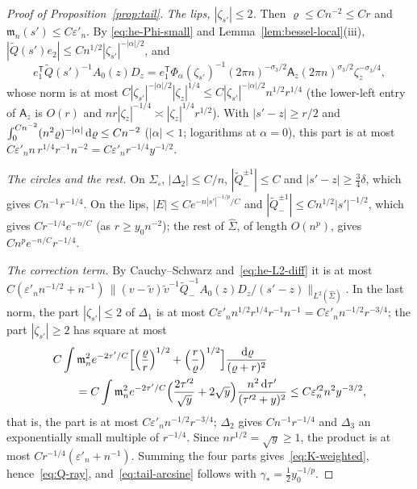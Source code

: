 \begin{proof}[Proof of Proposition~\ref{prop:tail}]
\emph{The lips, $|\zeta_{s'}|\le2$.} Then $\varrho\le Cn^{-2}\le Cr$ and $\mathfrak m_n(s')\le C\varepsilon'_n$. By
\eqref{eq:he-Phi-small} and Lemma~\ref{lem:bessel-local}(iii), $|\tilde Q(s')e_2|\le Cn^{1/2}|\zeta_{s'}|^{-|\alpha|/2}$, and
\[
  e_1^{\mathsf T}\tilde Q(s')^{-1}A_0(z)D_z=e_1^{\mathsf T}\Phi_\alpha(\zeta_{s'})^{-1}(2\pi n)^{-\sigma_3/2}\mathsf A_z(2\pi n)^{\sigma_3/2}
  \zeta_z^{-\sigma_3/4},
\]
whose norm is at most $C|\zeta_{s'}|^{-|\alpha|/2}|\zeta_z|^{1/4}\le C|\zeta_{s'}|^{-|\alpha|/2}n^{1/2}r^{1/4}$
(the lower-left entry of $\mathsf A_z$ is $O(r)$ and $nr|\zeta_z|^{-1/4}\asymp|\zeta_z|^{1/4}r^{1/2}$). With $|s'-z|\ge r/2$ and
$\int_0^{Cn^{-2}}(n^2\varrho)^{-|\alpha|}\,\mathrm{d}\varrho\le Cn^{-2}$ ($|\alpha|<1$; logarithms at $\alpha=0$), this part is at most
$C\varepsilon'_nn\,r^{1/4}r^{-1}n^{-2}=C\varepsilon'_nr^{-1/4}y^{-1/2}$.

\emph{The circles and the rest.} On $\Sigma_\circ$, $|\Delta_2|\le C/n$, $|\tilde Q_-^{\pm1}|\le C$ and $|s'-z|\ge\frac34\delta$,
which gives $Cn^{-1}r^{-1/4}$. On the lips, $|E|\le Ce^{-n|s'|^{-1/p}/C}$ and $|\tilde Q_-^{\pm1}|\le Cn^{1/2}|s'|^{-1/2}$, which
gives $Cr^{-1/4}e^{-n/C}$ (as $r\ge y_0n^{-2}$); the rest of $\hat\Sigma$, of length $O(n^p)$, gives $Cn^pe^{-n/C}r^{-1/4}$.

\emph{The correction term.} By Cauchy--Schwarz and~\eqref{eq:he-L2-diff} it is at most
$C(\varepsilon'_nn^{-1/2}+n^{-1})\,\|(v-\tilde v)\tilde v^{-1}\tilde Q_-^{-1}A_0(z)D_z/(s'-z)\|_{L^2(\hat\Sigma)}$. In the last norm, the
part $|\zeta_{s'}|\le2$ of $\Delta_1$ is at most $C\varepsilon'_nn^{1/2}r^{1/4}r^{-1}n^{-1}=C\varepsilon'_nn^{-1/2}r^{-3/4}$; the part
$|\zeta_{s'}|\ge2$ has square at most
\begin{align*}
  &C\int\mathfrak m_n^2e^{-2\tau'/C}\Bigl[\Bigl(\frac\varrho r\Bigr)^{1/2}+\Bigl(\frac r\varrho\Bigr)^{1/2}\Bigr]\frac{\,\mathrm{d}\varrho}{(\varrho+r)^2}\\
  &\qquad=C\int\mathfrak m_n^2e^{-2\tau'/C}\Bigl(\frac{2\tau'^2}{\sqrt y}+2\sqrt y\Bigr)\frac{n^2\,\mathrm{d} \tau'}{(\tau'^2+y)^2}\le C\varepsilon_n'^2n^2y^{-3/2},
\end{align*}
that is, the part is at most $C\varepsilon'_nn^{-1/2}r^{-3/4}$; $\Delta_2$ gives $Cn^{-1}r^{-1/4}$ and $\Delta_3$ an exponentially small
multiple of $r^{-1/4}$. Since $nr^{1/2}=\sqrt y\ge1$, the product is at most $Cr^{-1/4}(\varepsilon'_n+n^{-1})$. Summing the
four parts gives~\eqref{eq:K-weighted}, hence~\eqref{eq:Q-ray}, and~\eqref{eq:tail-arcsine} follows with $\gamma_*=\frac12y_0^{-1/p}$.


\end{proof}
